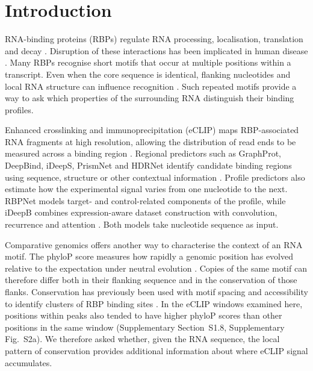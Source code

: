 \documentclass[webpdf,contemporary,large]{current_assets/oup-authoring-template}
\newcommand{\supfig}[1]{Supplementary Fig.~#1}
\newcommand{\supsect}[1]{Supplementary Section~#1}
\begin{document}
\maketitle

\section{Introduction}

RNA-binding proteins (RBPs) regulate RNA processing, localisation, translation and decay \citep{glisovic2008rbp,gerstberger2014census,corley2020rbp}. Disruption of these interactions has been implicated in human disease \citep{hentze2018brave,gebauer2021disease}. Many RBPs recognise short motifs that occur at multiple positions within a transcript. Even when the core sequence is identical, flanking nucleotides and local RNA structure can influence recognition \citep{dominguez2018rbpcontext}. Such repeated motifs provide a way to ask which properties of the surrounding RNA distinguish their binding profiles.

Enhanced crosslinking and immunoprecipitation (eCLIP) maps RBP-associated RNA fragments at high resolution, allowing the distribution of read ends to be measured across a binding region \citep{vannostrand2016eclip,vannostrand2020map,hafner2021clip,ramanathan2019methods}. Regional predictors such as GraphProt, DeepBind, iDeepS, PrismNet and HDRNet identify candidate binding regions using sequence, structure or other contextual information \citep{maticzka2014graphprot,alipanahi2015deepbind,pan2018ideeps,sun2021prismnet,Zhu2023HDRNet}. Profile predictors also estimate how the experimental signal varies from one nucleotide to the next. RBPNet models target- and control-related components of the profile, while iDeepB combines expression-aware dataset construction with convolution, recurrence and attention \citep{horlacher2023rbpnet,liu2025ideepb}. Both models take nucleotide sequence as input.

Comparative genomics offers another way to characterise the context of an RNA motif. The phyloP score measures how rapidly a genomic position has evolved relative to the expectation under neutral evolution \citep{siepel2005phylop,pollard2010phylop,lindbladtoh2011constraint}. Copies of the same motif can therefore differ both in their flanking sequence and in the conservation of those flanks. Conservation has previously been used with motif spacing and accessibility to identify clusters of RBP binding sites \citep{zhang2013mcarts}. In the eCLIP windows examined here, positions within peaks also tended to have higher phyloP scores than other positions in the same window (\supsect{S1.8}, \supfig{S2a}). We therefore asked whether, given the RNA sequence, the local pattern of conservation provides additional information about where eCLIP signal accumulates.
\end{document}
